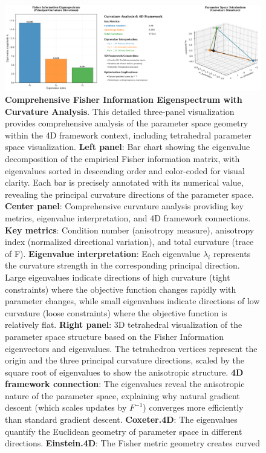 \documentclass[
  10pt,
]{article}
\begin{document}
\begin{figure}
\centering
\includegraphics{../output/figures/fisher_information_eigenspectrum.png}
\caption{\textbf{Comprehensive Fisher Information Eigenspectrum with
Curvature Analysis}. This detailed three-panel visualization provides
comprehensive analysis of the parameter space geometry within the 4D
framework context, including tetrahedral parameter space visualization.
\textbf{Left panel}: Bar chart showing the eigenvalue decomposition of
the empirical Fisher information matrix, with eigenvalues sorted in
descending order and color-coded for visual clarity. Each bar is
precisely annotated with its numerical value, revealing the principal
curvature directions of the parameter space. \textbf{Center panel}:
Comprehensive curvature analysis providing key metrics, eigenvalue
interpretation, and 4D framework connections. \textbf{Key metrics}:
Condition number (anisotropy measure), anisotropy index (normalized
directional variation), and total curvature (trace of F).
\textbf{Eigenvalue interpretation}: Each eigenvalue \(\lambda_i\)
represents the curvature strength in the corresponding principal
direction. Large eigenvalues indicate directions of high curvature
(tight constraints) where the objective function changes rapidly with
parameter changes, while small eigenvalues indicate directions of low
curvature (loose constraints) where the objective function is relatively
flat. \textbf{Right panel}: 3D tetrahedral visualization of the
parameter space structure based on the Fisher Information eigenvectors
and eigenvalues. The tetrahedron vertices represent the origin and the
three principal curvature directions, scaled by the square root of
eigenvalues to show the anisotropic structure. \textbf{4D framework
connection}: The eigenvalues reveal the anisotropic nature of the
parameter space, explaining why natural gradient descent (which scales
updates by \(F^{-1}\)) converges more efficiently than standard gradient
descent. \textbf{Coxeter.4D}: The eigenvalues quantify the Euclidean
geometry of parameter space in different directions.
\textbf{Einstein.4D}: The Fisher metric geometry creates curved
}
\end{figure}
\end{document}
